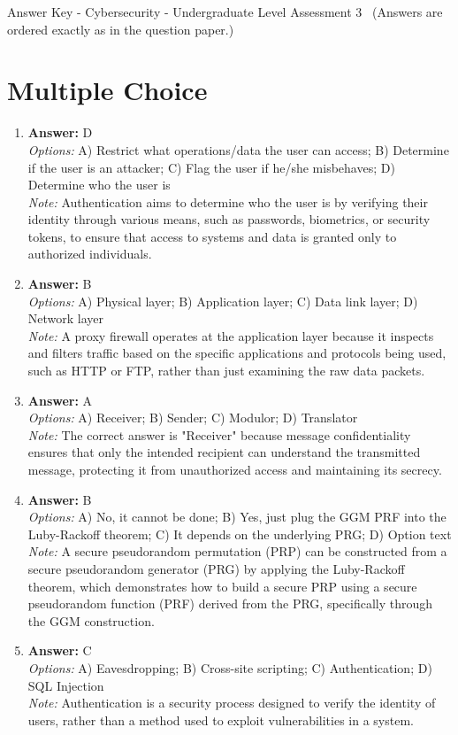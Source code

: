 \documentclass[12pt]{article}
\begin{document}
\begin{center}
Answer Key - Cybersecurity - Undergraduate Level Assessment 3 \
\small (Answers are ordered exactly as in the question paper.)
\end{center}

\section*{Multiple Choice}
\begin{enumerate}[label=\arabic*.]
\item \textbf{Answer:} D
\\ \textit{Options:} A) Restrict what operations/data the user can access; B) Determine if the user is an attacker; C) Flag the user if he/she misbehaves; D) Determine who the user is
\\ \textit{Note:} Authentication aims to determine who the user is by verifying their identity through various means, such as passwords, biometrics, or security tokens, to ensure that access to systems and data is granted only to authorized individuals.
\item \textbf{Answer:} B
\\ \textit{Options:} A) Physical layer; B) Application layer; C) Data link layer; D) Network layer
\\ \textit{Note:} A proxy firewall operates at the application layer because it inspects and filters traffic based on the specific applications and protocols being used, such as HTTP or FTP, rather than just examining the raw data packets.
\item \textbf{Answer:} A
\\ \textit{Options:} A) Receiver; B) Sender; C) Modulor; D) Translator
\\ \textit{Note:} The correct answer is "Receiver" because message confidentiality ensures that only the intended recipient can understand the transmitted message, protecting it from unauthorized access and maintaining its secrecy.
\item \textbf{Answer:} B
\\ \textit{Options:} A) No, it cannot be done; B) Yes, just plug the GGM PRF into the Luby-Rackoff theorem; C) It depends on the underlying PRG; D) Option text
\\ \textit{Note:} A secure pseudorandom permutation (PRP) can be constructed from a secure pseudorandom generator (PRG) by applying the Luby-Rackoff theorem, which demonstrates how to build a secure PRP using a secure pseudorandom function (PRF) derived from the PRG, specifically through the GGM construction.
\item \textbf{Answer:} C
\\ \textit{Options:} A) Eavesdropping; B) Cross-site scripting; C) Authentication; D) SQL Injection
\\ \textit{Note:} Authentication is a security process designed to verify the identity of users, rather than a method used to exploit vulnerabilities in a system.
\end{enumerate}
\end{document}
